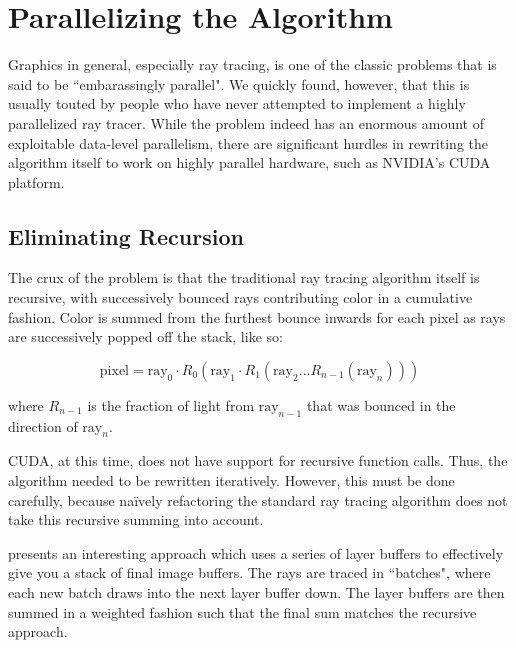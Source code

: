 \documentclass{acmsiggraph}                     %
\begin{document}
\section{Parallelizing the Algorithm}
\label{sec:parallelalgo}

Graphics in general, especially ray tracing, is one of the classic problems that is
said to be ``embarassingly parallel". We quickly found, however, that this is usually
touted by people who have never attempted to implement a highly parallelized ray
tracer. While the problem indeed has an enormous amount of exploitable data-level
parallelism, there are significant hurdles in rewriting the algorithm itself to work
on highly parallel hardware, such as NVIDIA's CUDA platform.

    \subsection{Eliminating Recursion}
    \label{sec:recursion}

    The crux of the problem is that the traditional ray tracing algorithm itself is
    recursive, with successively bounced rays contributing color in a cumulative fashion.
    Color is summed from the furthest bounce inwards for each pixel as rays are
    successively popped off the stack, like so:
    
    \begin{equation}
        \label{eq:recursive_sum}
        \textrm{pixel} = \textrm{ray}_{0} \cdot R_{0} \left( \textrm{ray}_{1} \cdot R_{1}
            \left( \textrm{ray}_{2} \ldots R_{n - 1} \left( \textrm{ray}_{n} \right) \right)
        \right)
    \end{equation}

    where $R_{n - 1}$ is the fraction of light from $\textrm{ray}_{n - 1}$ that was bounced
    in the direction of $\textrm{ray}_{n}$. 
    
    CUDA, at this time, does not have support for recursive function calls. Thus, the
    algorithm needed to be rewritten iteratively. However, this must be done carefully, because
    na\"{i}vely refactoring the standard ray tracing algorithm does not take this recursive
    summing into account.

    \cite{Segovia09} presents an interesting approach which uses a series of
    layer buffers to effectively give you a stack of final image buffers. The rays are traced
    in ``batches", where each new batch draws into the next layer buffer down. The layer buffers
    are then summed in a weighted fashion such that the final sum matches the recursive approach.
    
\end{document}
